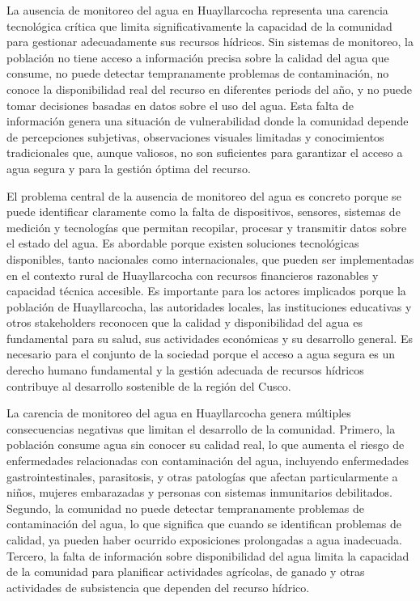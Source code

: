 La ausencia de monitoreo del agua en Huayllarcocha representa una carencia tecnológica crítica que limita significativamente la capacidad de la comunidad para gestionar adecuadamente sus recursos hídricos. Sin sistemas de monitoreo, la población no tiene acceso a información precisa sobre la calidad del agua que consume, no puede detectar tempranamente problemas de contaminación, no conoce la disponibilidad real del recurso en diferentes periods del año, y no puede tomar decisiones basadas en datos sobre el uso del agua. Esta falta de información genera una situación de vulnerabilidad donde la comunidad depende de percepciones subjetivas, observaciones visuales limitadas y conocimientos tradicionales que, aunque valiosos, no son suficientes para garantizar el acceso a agua segura y para la gestión óptima del recurso.

El problema central de la ausencia de monitoreo del agua es concreto porque se puede identificar claramente como la falta de dispositivos, sensores, sistemas de medición y tecnologías que permitan recopilar, procesar y transmitir datos sobre el estado del agua. Es abordable porque existen soluciones tecnológicas disponibles, tanto nacionales como internacionales, que pueden ser implementadas en el contexto rural de Huayllarcocha con recursos financieros razonables y capacidad técnica accesible. Es importante para los actores implicados porque la población de Huayllarcocha, las autoridades locales, las instituciones educativas y otros stakeholders reconocen que la calidad y disponibilidad del agua es fundamental para su salud, sus actividades económicas y su desarrollo general. Es necesario para el conjunto de la sociedad porque el acceso a agua segura es un derecho humano fundamental y la gestión adecuada de recursos hídricos contribuye al desarrollo sostenible de la región del Cusco.

La carencia de monitoreo del agua en Huayllarcocha genera múltiples consecuencias negativas que limitan el desarrollo de la comunidad. Primero, la población consume agua sin conocer su calidad real, lo que aumenta el riesgo de enfermedades relacionadas con contaminación del agua, incluyendo enfermedades gastrointestinales, parasitosis, y otras patologías que afectan particularmente a niños, mujeres embarazadas y personas con sistemas inmunitarios debilitados. Segundo, la comunidad no puede detectar tempranamente problemas de contaminación del agua, lo que significa que cuando se identifican problemas de calidad, ya pueden haber ocurrido exposiciones prolongadas a agua inadecuada. Tercero, la falta de información sobre disponibilidad del agua limita la capacidad de la comunidad para planificar actividades agrícolas, de ganado y otras actividades de subsistencia que dependen del recurso hídrico.

